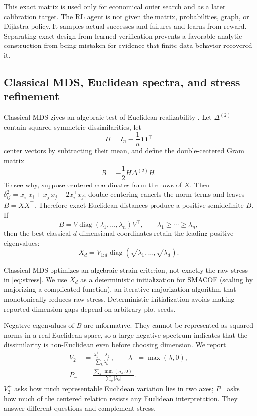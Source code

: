 \documentclass[11pt]{article}
\newcommand{\diag}{\operatorname{diag}}
\begin{document}
This exact matrix is used only for economical outer search and as a later
calibration target. The RL agent is not given the matrix, probabilities, graph,
or Dijkstra policy. It samples actual successes and failures and learns from
reward. Separating exact design from learned verification prevents a favorable
analytic construction from being mistaken for evidence that finite-data
behavior recovered it.

\subsection{Classical MDS, Euclidean spectra, and stress refinement}

Classical MDS gives an algebraic test of Euclidean realizability
\cite{torgerson1952,gower1966}. Let $\Delta^{(2)}$ contain squared symmetric
dissimilarities, let
\begin{equation}
 H=I_n-\frac1n\bm1\bm1^\top
 \end{equation}
center vectors by subtracting their mean, and define the double-centered Gram
matrix
\begin{equation}
 B=-\frac12H\Delta^{(2)}H.
 \label{eq:double-centering}
\end{equation}
To see why, suppose centered coordinates form the rows of $X$. Then
$\delta_{ij}^2=x_i^\top x_i+x_j^\top x_j-2x_i^\top x_j$; double centering
cancels the norm terms and leaves $B=XX^\top$. Therefore exact Euclidean
distances produce a positive-semidefinite $B$. If
\begin{equation}
 B=V\diag(\lambda_1,\ldots,\lambda_n)V^\top,
 \qquad\lambda_1\geq\cdots\geq\lambda_n,
\end{equation}
then the best classical $d$-dimensional coordinates retain the leading
positive eigenvalues:
\begin{equation}
 X_d=V_{1:d}\diag(\sqrt{\lambda_1},\ldots,\sqrt{\lambda_d}).
 \label{eq:cmds-coordinates}
\end{equation}

Classical MDS optimizes an algebraic strain criterion, not exactly the raw
stress in \cref{eq:stress}. We use $X_d$ as a deterministic initialization for
SMACOF (scaling by majorizing a complicated function), an iterative
majorization algorithm that monotonically reduces raw stress. Deterministic
initialization avoids making reported dimension gaps depend on arbitrary plot
seeds.

Negative eigenvalues of $B$ are informative. They cannot be represented as
squared norms in a real Euclidean space, so a large negative spectrum indicates
that the dissimilarity is non-Euclidean even before choosing dimension. We
report
\begin{align}
 V_2^+&=\frac{\lambda_1^++\lambda_2^+}
 {\sum_k\lambda_k^+},\qquad \lambda^+=\max(\lambda,0),
 \label{eq:positive-variance}\\
 P_-&=\frac{\sum_k|\min(\lambda_k,0)|}
 {\sum_k|\lambda_k|}.
 \label{eq:negative-spectrum}
\end{align}
$V_2^+$ asks how much representable Euclidean variation lies in two axes;
$P_-$ asks how much of the centered relation resists any Euclidean
interpretation. They answer different questions and complement stress.
\end{document}
